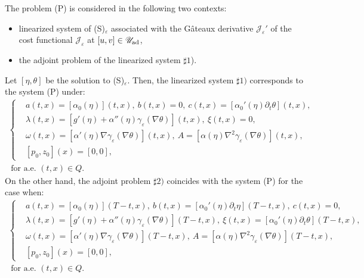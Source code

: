 \documentclass{sinst}
\numberwithin{equation}{section}
\theoremstyle{plain}
\theoremstyle{definition}
\def\sJ{\mathscr{J}}
\def\sU{\mathscr{U}}
\def\ad{{\rm ad}}
\begin{document}
The problem (P) is considered in the following two contexts:
\begin{itemize}
  \item[$\sharp 1$)] linearized system of (S)$_\varepsilon$ associated with the G\^{a}teaux derivative $\sJ_\varepsilon'$ of the cost functional $\sJ_\varepsilon$ at $[u,v] \in \sU_\ad$,
  \item[$\sharp 2$)] the adjoint problem of the linearized system $\sharp 1$). 
\end{itemize}
Let $[\eta,\theta]$ be the solution to (S)$_\varepsilon$. Then, the linearized system $\sharp 1)$ corresponds to the system (P) under:
\begin{gather}
  \left\{ \begin{aligned}
    &a(t,x) = [\alpha_0(\eta)](t,x), \ b(t,x) = 0, \ c(t,x) = [\alpha_0'(\eta) \partial_t \theta](t,x), 
    \\ 
    &\lambda(t,x) = [g'(\eta) + \alpha''(\eta) \gamma_\varepsilon(\nabla \theta)](t,x), \ \xi(t,x) = 0,
    \\
    &\omega(t,x) = [\alpha'(\eta) \nabla \gamma_\varepsilon(\nabla \theta)](t,x), \ A = [\alpha(\eta) \nabla^2 \gamma_\varepsilon(\nabla \theta)](t,x),
    \\
    &[p_0, z_0](x) = [0,0],
  \end{aligned} \right. \label{(P)ex1}
  \\
  \mbox{ for a.e. } (t,x) \in Q. 
\end{gather}
On the other hand, the adjoint problem $\sharp 2)$ coincides with the system (P) for the case when:
\begin{gather}
  \left\{ \begin{aligned}
    &a(t,x) = [\alpha_0(\eta)](T-t,x), \ b(t,x) = [\alpha_0'(\eta) \partial_t \eta](T-t,x), \ c(t,x) = 0,
    \\ 
    &\lambda(t,x) = [g'(\eta) + \alpha''(\eta) \gamma_\varepsilon(\nabla \theta)](T-t,x), \ \xi(t,x) = [\alpha_0'(\eta) \partial_t \theta](T-t,x),
    \\
    &\omega(t,x) = [\alpha'(\eta) \nabla \gamma_\varepsilon(\nabla \theta)](T-t,x), \ A = [\alpha(\eta) \nabla^2 \gamma_\varepsilon(\nabla \theta)](T-t,x),
    \\
    &[p_0, z_0](x) = [0,0],
  \end{aligned} \right. \label{(P)ex2}
  \\
  \mbox{ for a.e. } (t,x) \in Q. 
\end{gather}
\end{document}
